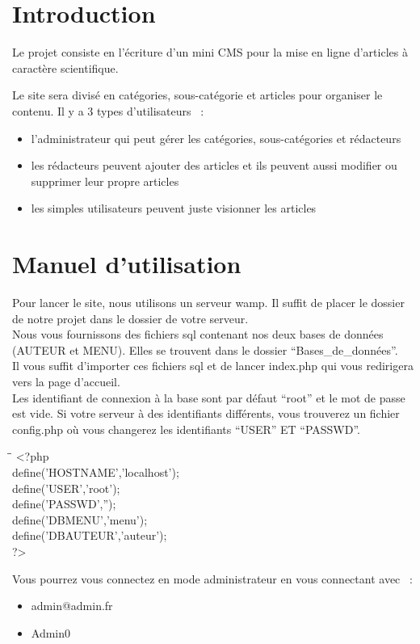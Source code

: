 \documentclass[hidelinks, 12pt,a4paper]{article}
\begin{document}
\newpage
\tableofcontents

\newpage
\section{Introduction}
Le projet consiste en l'écriture d'un mini CMS pour la mise en ligne d'articles à caractère scientifique.

Le site sera divisé en catégories, sous-catégorie et articles pour organiser le contenu.
Il y a 3 types d'utilisateurs ~:\\ 
\begin{itemize}
\item l'administrateur qui peut gérer les catégories, sous-catégories et rédacteurs
\item les rédacteurs peuvent ajouter des articles et ils peuvent aussi modifier ou supprimer leur propre articles 
\item les simples utilisateurs peuvent juste visionner les articles
\end{itemize}

\newpage
\section{Manuel d'utilisation}
Pour lancer le site, nous utilisons un serveur wamp. Il suffit de placer le dossier de notre projet dans le dossier de votre serveur.\\

Nous vous fournissons des fichiers sql contenant nos deux bases de données (AUTEUR et MENU). Elles se trouvent dans le dossier ``Bases\_de\_données''.\\

Il vous suffit d'importer ces fichiers sql et de lancer index.php qui vous redirigera vers la page d'accueil.\\

Les identifiant de connexion à la base sont par défaut ``root'' et le mot de passe est vide. Si votre serveur à des identifiants différents, vous trouverez un fichier config.php où vous changerez les identifiants ``USER'' ET ``PASSWD''.\\

\begin{tabbing}
\hspace{2cm}\=\hspace{2cm}\=\kill
<?php\\
\>	define('HOSTNAME','localhost');\\
\>	define('USER','root');\\
\>	define('PASSWD','');\\
\>	define('DBMENU','menu');\\
\>	define('DBAUTEUR','auteur');\\
?>\\
\end{tabbing} 
Vous pourrez vous connectez en mode administrateur en vous connectant avec ~:\\
\begin{itemize}
\item admin@admin.fr
\item Admin0
\end{itemize}
\end{document}
